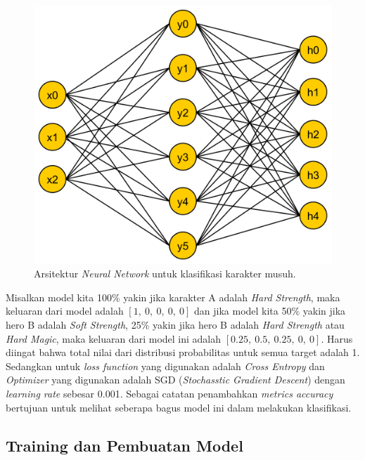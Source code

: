 \begin{figure} [!h] \centering
	\includegraphics[scale=0.075]{img/nn_enemy_character.png}
	\caption{Arsitektur \textit{Neural Network} untuk klasifikasi karakter musuh.}
	\label{fig:nn_enemy}
\end{figure}

Misalkan model kita 100\% yakin jika karakter A adalah \textit{Hard Strength}, maka keluaran dari model adalah $\left[1,\ 0,\ 0,\ 0,\ 0 \right]$ dan jika model kita 50\% yakin jika hero B adalah \textit{Soft Strength}, 25\% yakin jika hero B adalah \textit{Hard Strength} atau \textit{Hard Magic}, maka keluaran dari model ini adalah $\left[0.25,\ 0.5,\ 0.25, \ 0, \ 0 \right]$. Harus diingat bahwa total nilai dari distribusi probabilitas untuk semua target adalah 1. Sedangkan untuk \textit{loss function} yang digunakan adalah \textit{Cross Entropy} dan \textit{Optimizer} yang digunakan adalah SGD (\textit{Stochasstic Gradient Descent}) dengan \textit{learning rate} sebesar 0.001. Sebagai catatan penambahkan \textit{metrics accuracy} bertujuan untuk melihat seberapa bagus model ini dalam melakukan klasifikasi.
\vspace{1ex}

\subsection{Training dan Pembuatan Model}
\label{sec:sub_sec3_enemy_char_train}
\vspace{1ex}

